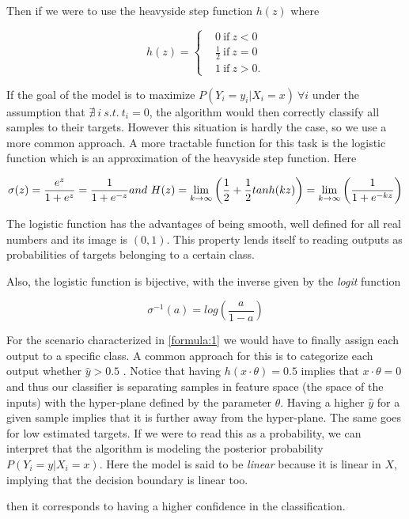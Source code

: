 Then if we were to use the heavyside step function $h(z)$  where

\[
    h(z) =
      \begin{cases}
        &0 \ \mbox{if} \ z<0 \\
        &\frac{1}{2} \ \mbox{if} \  z=0 \\
        &1 \ \mbox{if} \  z>0.
      \end{cases}
    \]

If the goal of the model is to maximize $P(Y_i = y_i | X_i = x) \ \forall i$
under the assumption that $\nexists\  i \  s.t. \ t_i = 0$, the algorithm would then correctly classify all samples to their targets. However this situation is hardly the case, so we use a more common approach. A more tractable function for this task is the logistic function which is an approximation of the heavyside step function. Here  

\begin{equation} \label{eq:logisticFunction}
\sigma(z)  = \frac{e^{z}}{1 + e^{z}} = \frac{1}{1 + e^{-z}}  \\
and \  H(z) = \lim_{k \to \infty} \left(\frac{1}{2} + \frac{1}{2}tanh(kz) \right) = \lim_{k \to \infty} \left(\frac{1}{1+e^{-kz}} \right)  
\end{equation}

The logistic function has the advantages of being smooth, well defined for all real numbers and its image is $(0,1)$. This property lends itself to reading outputs as probabilities of targets belonging to a certain class. 

Also, the logistic function is bijective, with the inverse given by the \textit{logit} function 

\begin{equation} \label{eq:logitFunction}
\sigma^{-1}(a)  = log( \frac{a}{1 -a})    
\end{equation}

For the scenario characterized in \ref{formula:1} we would have to finally assign each output to a specific class. A common approach for this is to categorize each output whether $\hat{y} > 0.5$ \label{formula:logitThreshold}. Notice that having $h(x \cdot \theta) = 0.5$ implies that $x \cdot  \theta = 0$ and thus our classifier is separating samples in feature space (the space of the inputs) with the hyper-plane defined by the parameter $\theta$. Having a higher $\hat{y}$ for a given sample implies that it is further away from the hyper-plane. The same goes for low estimated targets. If we were to read this as a probability, we can interpret that the algorithm is modeling the posterior probability $P(Y_i = y | X_i = x)$. Here the model is said to be \textit{linear} because it is linear in $X$, implying that the decision boundary is linear too. 

then it corresponds to having a higher confidence in the classification.


